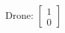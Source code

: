 \documentclass[preview]{standalone}
\begin{document}
\begin{align*}
\text{Drone: } \begin{bmatrix} 1 \\ 0 \end{bmatrix}
\end{align*}
\end{document}
